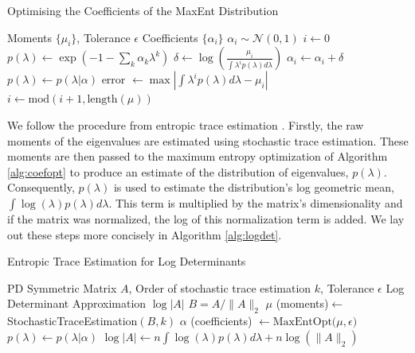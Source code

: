 \documentclass[journal]{IEEEtran}
\begin{document}
	\begin{algorithm}
		\caption{Optimising the Coefficients of the MaxEnt Distribution}\label{alg:coefopt}
		\begin{algorithmic}[1]
			\vspace{0.5em}
			\Require Moments $\{\mu_i\}$, Tolerance $\epsilon$ 
			\Ensure Coefficients $\{\alpha_i\}$
			\State $\alpha_i \sim \mathcal{N}(0,1)$
			\State $i \gets 0$
			\State $p(\lambda) \gets \exp(-1 - \sum_k \alpha_k \lambda^k)$
			\State $\delta \gets \log \left(\frac{\mu_i}{\int \lambda^i p(\lambda) d\lambda} \right)$
			\State $\alpha_i \gets \alpha_i + \delta$
			\State $p(\lambda) \gets p(\lambda | \alpha)$
			\State error $\gets \max |\int \lambda^i p(\lambda) d\lambda - \mu_i|$
			\State $i \gets \text{mod}(i+1, \text{length}(\mu))$
			\EndWhile 
		\end{algorithmic}
	\end{algorithm}
	
	We follow the procedure from entropic trace estimation \cite{ete}. Firstly, the raw moments of the eigenvalues are estimated using stochastic trace estimation. These moments are then passed to the maximum entropy optimization of Algorithm \ref{alg:coefopt} to produce an estimate of the distribution of eigenvalues, $p(\lambda)$.
	Consequently, $p(\lambda)$ is used to estimate the distribution's log geometric mean, $\int \log(\lambda) p(\lambda) d\lambda$.
	This term is multiplied by the matrix's dimensionality and if the matrix was normalized, the log of this normalization term is added. We lay out these steps more concisely in Algorithm \ref{alg:logdet}.  
	
	\algrenewcommand\algorithmicindent{1.3em}
	\renewcommand{\algorithmicrequire}{\textbf{Input:}}
	\renewcommand{\algorithmicensure}{\textbf{Output:}}
	
	\begin{algorithm}
		\caption{Entropic Trace Estimation for Log Determinants}\label{alg:logdet}
		\begin{algorithmic}[1]
			\vspace{0.5em}
			\Require PD Symmetric Matrix $A$, Order of stochastic trace estimation $k$, Tolerance $\epsilon$
			\Ensure Log Determinant Approximation $\log|A|$
			\State $B = A/\|A\|_2$
			\State $\mu$ (moments)$ \gets$ StochasticTraceEstimation$(B, k)$ 
			\State $\alpha$ (coefficients) $\gets \text{MaxEntOpt(}\mu, \epsilon)$
			\State $p(\lambda) \gets p(\lambda | \alpha)$
			\State $\log|A| \gets n\int \log(\lambda) p(\lambda) d\lambda + n\log(\|A\|_2)$
		\end{algorithmic}
	\end{algorithm}
	
\end{document}
